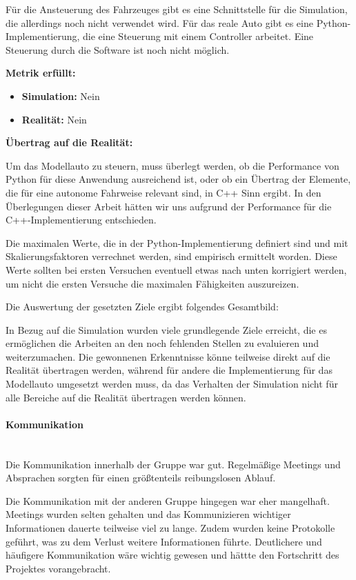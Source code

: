 \begin{enumerate}[leftmargin=*]
    Für die Ansteuerung des Fahrzeuges gibt es eine Schnittstelle für die Simulation, die allerdings noch nicht verwendet wird.
    Für das reale Auto gibt es eine Python-Implementierung, die eine Steuerung mit einem Controller arbeitet. 
    Eine Steuerung durch die Software ist noch nicht möglich.

    \textbf{Metrik erfüllt:}
    \begin{itemize}
        \item \textbf{Simulation:} Nein
        \item \textbf{Realität:} Nein
    \end{itemize}
    
    \textbf{Übertrag auf die Realität:}

    Um das Modellauto zu steuern, muss überlegt werden, ob die Performance von Python für diese Anwendung ausreichend ist, 
    oder ob ein Übertrag der Elemente, die für eine autonome Fahrweise relevant sind, in C++ Sinn ergibt. 
    In den Überlegungen dieser Arbeit hätten wir uns aufgrund der Performance für die C++-Implementierung entschieden.

    Die maximalen Werte, die in der Python-Implementierung definiert sind und mit Skalierungsfaktoren verrechnet werden, 
    sind empirisch ermittelt worden. Diese Werte sollten bei ersten Versuchen eventuell etwas nach unten korrigiert werden,
    um nicht die ersten Versuche die maximalen Fähigkeiten auszureizen.
\end{enumerate}

Die Auswertung der gesetzten Ziele ergibt folgendes Gesamtbild:

In Bezug auf die Simulation wurden viele grundlegende Ziele erreicht, die es ermöglichen die Arbeiten an den noch fehlenden Stellen zu evaluieren 
und weiterzumachen.
Die gewonnenen Erkenntnisse könne teilweise direkt auf die Realität übertragen werden, während für andere die Implementierung für das Modellauto 
umgesetzt werden muss, da das Verhalten der Simulation nicht für alle Bereiche auf die Realität übertragen werden können.

\paragraph{Kommunikation} \mbox{}\\
Die Kommunikation innerhalb der Gruppe war gut.
Regelmäßige Meetings und Absprachen sorgten für einen größtenteils reibungslosen Ablauf.

Die Kommunikation mit der anderen Gruppe hingegen war eher mangelhaft.
Meetings wurden selten gehalten und das Kommunizieren wichtiger Informationen dauerte teilweise viel zu lange.
Zudem wurden keine Protokolle geführt, was zu dem Verlust weitere Informationen führte.
Deutlichere und häufigere Kommunikation wäre wichtig gewesen und hättte den Fortschritt des Projektes vorangebracht.


